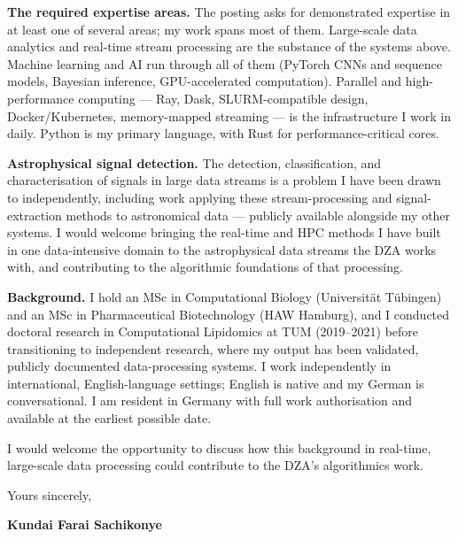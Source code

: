 \documentclass[12pt,a4paper]{article}
\begin{document}
\textbf{The required expertise areas.}
The posting asks for demonstrated expertise in at least one of several areas; my
work spans most of them. Large-scale data analytics and real-time stream
processing are the substance of the systems above. Machine learning and AI run
through all of them (PyTorch CNNs and sequence models, Bayesian inference,
GPU-accelerated computation). Parallel and high-performance computing --- Ray,
Dask, SLURM-compatible design, Docker/Kubernetes, memory-mapped streaming --- is
the infrastructure I work in daily. Python is my primary language, with Rust for
performance-critical cores.

\textbf{Astrophysical signal detection.}
The detection, classification, and characterisation of signals in large data
streams is a problem I have been drawn to independently, including work applying
these stream-processing and signal-extraction methods to astronomical data ---
publicly available alongside my other systems. I would welcome bringing the
real-time and HPC methods I have built in one data-intensive domain to the
astrophysical data streams the DZA works with, and contributing to the
algorithmic foundations of that processing.

\textbf{Background.}
I hold an MSc in Computational Biology (Universit\"at T\"ubingen) and an MSc in
Pharmaceutical Biotechnology (HAW Hamburg), and I conducted doctoral research in
Computational Lipidomics at TUM (2019--2021) before transitioning to independent
research, where my output has been validated, publicly documented data-processing
systems. I work independently in international, English-language settings; English
is native and my German is conversational. I am resident in Germany with full
work authorisation and available at the earliest possible date.

I would welcome the opportunity to discuss how this background in real-time,
large-scale data processing could contribute to the DZA's algorithmics work.

\vspace{1.5em}
Yours sincerely,

\vspace{2.5em}
\textbf{Kundai Farai Sachikonye}
\end{document}
